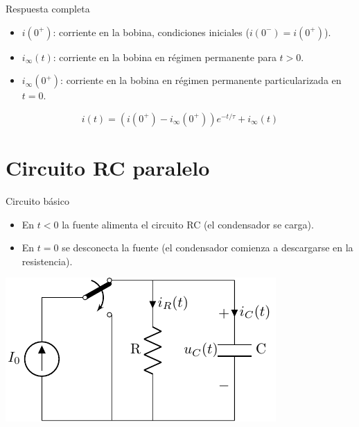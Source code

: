 \documentclass[xcolor={usenames,svgnames,dvipsnames}]{beamer}
\begin{document}
\begin{frame}[label={sec:org11046a1}]{Respuesta completa}
\begin{itemize}
\item \(i(0^+)\): corriente en la bobina, condiciones iniciales (\(i(0^-) = i(0^+)\)).
\item \(i_\infty(t)\): corriente en la bobina en régimen permanente para \(t > 0\).
\item \(i_\infty(0^+)\): corriente en la bobina en régimen permanente particularizada en \(t = 0\).
\end{itemize}

\[
i(t) = \left(i(0^+) - i_\infty(0^+)\right) e^{-t/\tau} + i_\infty(t)
\]
\end{frame}

\section{Circuito RC paralelo}
\label{sec:orgb5fbdab}

\begin{frame}[label={sec:org119a0f8}]{Circuito básico}
\begin{itemize}
\item En \(t <0\) la fuente alimenta el circuito RC (el condensador se carga).
\item En \(t = 0\) se desconecta la fuente (el condensador comienza a descargarse en la resistencia).
\end{itemize}
\begin{center}
\includegraphics[width=.9\linewidth]{figs/transitorio_circuitoRC.pdf}
\end{center}
\end{frame}
\end{document}
